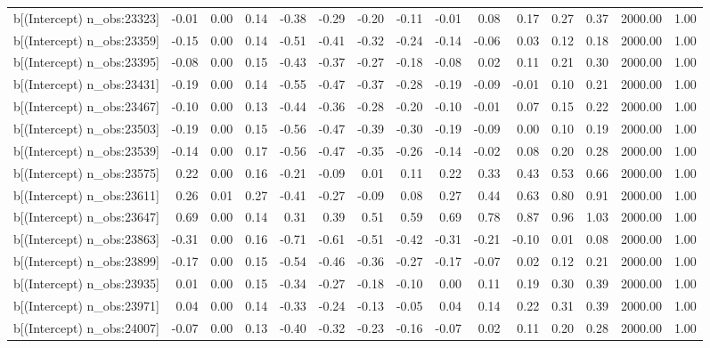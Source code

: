 \begin{table}[ht]
\begin{tabular}{rrrrrrrrrrrrrrr}
  b[(Intercept) n\_obs:23323] & -0.01 & 0.00 & 0.14 & -0.38 & -0.29 & -0.20 & -0.11 & -0.01 & 0.08 & 0.17 & 0.27 & 0.37 & 2000.00 & 1.00 \\ 
  b[(Intercept) n\_obs:23359] & -0.15 & 0.00 & 0.14 & -0.51 & -0.41 & -0.32 & -0.24 & -0.14 & -0.06 & 0.03 & 0.12 & 0.18 & 2000.00 & 1.00 \\ 
  b[(Intercept) n\_obs:23395] & -0.08 & 0.00 & 0.15 & -0.43 & -0.37 & -0.27 & -0.18 & -0.08 & 0.02 & 0.11 & 0.21 & 0.30 & 2000.00 & 1.00 \\ 
  b[(Intercept) n\_obs:23431] & -0.19 & 0.00 & 0.14 & -0.55 & -0.47 & -0.37 & -0.28 & -0.19 & -0.09 & -0.01 & 0.10 & 0.21 & 2000.00 & 1.00 \\ 
  b[(Intercept) n\_obs:23467] & -0.10 & 0.00 & 0.13 & -0.44 & -0.36 & -0.28 & -0.20 & -0.10 & -0.01 & 0.07 & 0.15 & 0.22 & 2000.00 & 1.00 \\ 
  b[(Intercept) n\_obs:23503] & -0.19 & 0.00 & 0.15 & -0.56 & -0.47 & -0.39 & -0.30 & -0.19 & -0.09 & 0.00 & 0.10 & 0.19 & 2000.00 & 1.00 \\ 
  b[(Intercept) n\_obs:23539] & -0.14 & 0.00 & 0.17 & -0.56 & -0.47 & -0.35 & -0.26 & -0.14 & -0.02 & 0.08 & 0.20 & 0.28 & 2000.00 & 1.00 \\ 
  b[(Intercept) n\_obs:23575] & 0.22 & 0.00 & 0.16 & -0.21 & -0.09 & 0.01 & 0.11 & 0.22 & 0.33 & 0.43 & 0.53 & 0.66 & 2000.00 & 1.00 \\ 
  b[(Intercept) n\_obs:23611] & 0.26 & 0.01 & 0.27 & -0.41 & -0.27 & -0.09 & 0.08 & 0.27 & 0.44 & 0.63 & 0.80 & 0.91 & 2000.00 & 1.00 \\ 
  b[(Intercept) n\_obs:23647] & 0.69 & 0.00 & 0.14 & 0.31 & 0.39 & 0.51 & 0.59 & 0.69 & 0.78 & 0.87 & 0.96 & 1.03 & 2000.00 & 1.00 \\ 
  b[(Intercept) n\_obs:23863] & -0.31 & 0.00 & 0.16 & -0.71 & -0.61 & -0.51 & -0.42 & -0.31 & -0.21 & -0.10 & 0.01 & 0.08 & 2000.00 & 1.00 \\ 
  b[(Intercept) n\_obs:23899] & -0.17 & 0.00 & 0.15 & -0.54 & -0.46 & -0.36 & -0.27 & -0.17 & -0.07 & 0.02 & 0.12 & 0.21 & 2000.00 & 1.00 \\ 
  b[(Intercept) n\_obs:23935] & 0.01 & 0.00 & 0.15 & -0.34 & -0.27 & -0.18 & -0.10 & 0.00 & 0.11 & 0.19 & 0.30 & 0.39 & 2000.00 & 1.00 \\ 
  b[(Intercept) n\_obs:23971] & 0.04 & 0.00 & 0.14 & -0.33 & -0.24 & -0.13 & -0.05 & 0.04 & 0.14 & 0.22 & 0.31 & 0.39 & 2000.00 & 1.00 \\ 
  b[(Intercept) n\_obs:24007] & -0.07 & 0.00 & 0.13 & -0.40 & -0.32 & -0.23 & -0.16 & -0.07 & 0.02 & 0.11 & 0.20 & 0.28 & 2000.00 & 1.00 \\ 

\end{tabular}
\end{table}
